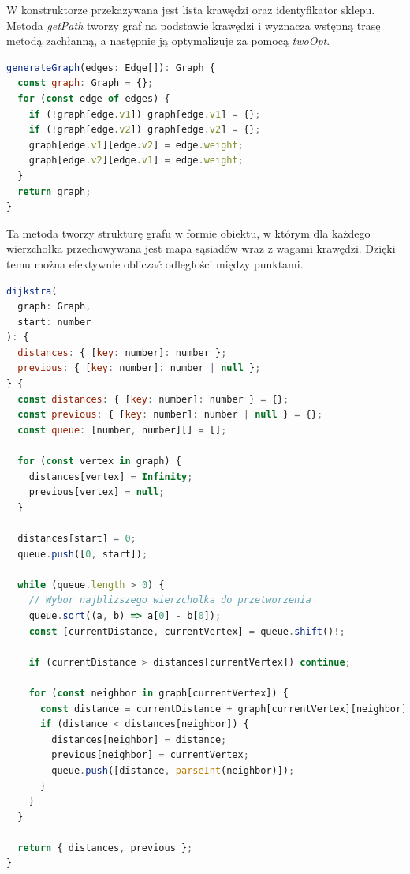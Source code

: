 W konstruktorze przekazywana jest lista krawędzi oraz identyfikator sklepu. Metoda \textit{getPath} tworzy graf na podstawie krawędzi i wyznacza wstępną trasę metodą zachłanną, a następnie ją optymalizuje za pomocą \textit{twoOpt}.

\begin{lstlisting}[language=JavaScript, caption={Generowanie grafu na podstawie krawędzi}, label={lst:pathfinding_graph}]
generateGraph(edges: Edge[]): Graph {
  const graph: Graph = {};
  for (const edge of edges) {
    if (!graph[edge.v1]) graph[edge.v1] = {};
    if (!graph[edge.v2]) graph[edge.v2] = {};
    graph[edge.v1][edge.v2] = edge.weight;
    graph[edge.v2][edge.v1] = edge.weight;
  }
  return graph;
}
\end{lstlisting}

Ta metoda tworzy strukturę grafu w formie obiektu, w którym dla każdego wierzchołka przechowywana jest mapa sąsiadów wraz z wagami krawędzi. Dzięki temu można efektywnie obliczać odległości między punktami.

\begin{lstlisting}[language=JavaScript, caption={Algorytm Dijkstry do wyznaczania najkrótszych ścieżek}, label={lst:pathfinding_dijkstra}]
dijkstra(
  graph: Graph,
  start: number
): {
  distances: { [key: number]: number };
  previous: { [key: number]: number | null };
} {
  const distances: { [key: number]: number } = {};
  const previous: { [key: number]: number | null } = {};
  const queue: [number, number][] = [];

  for (const vertex in graph) {
    distances[vertex] = Infinity;
    previous[vertex] = null;
  }

  distances[start] = 0;
  queue.push([0, start]);

  while (queue.length > 0) {
    // Wybor najblizszego wierzcholka do przetworzenia
    queue.sort((a, b) => a[0] - b[0]);
    const [currentDistance, currentVertex] = queue.shift()!;

    if (currentDistance > distances[currentVertex]) continue;

    for (const neighbor in graph[currentVertex]) {
      const distance = currentDistance + graph[currentVertex][neighbor];
      if (distance < distances[neighbor]) {
        distances[neighbor] = distance;
        previous[neighbor] = currentVertex;
        queue.push([distance, parseInt(neighbor)]);
      }
    }
  }

  return { distances, previous };
}
\end{lstlisting}


